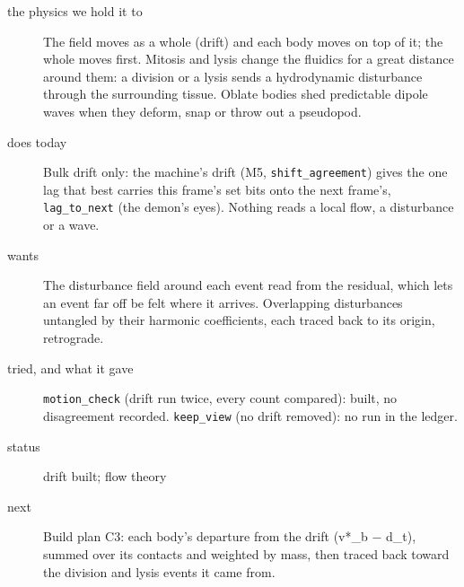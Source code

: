 \begin{description}
\item[{the physics we hold it to}] The field moves as a whole (drift) and each body moves on top of it; the whole moves first. Mitosis and lysis change the fluidics for a great distance around them: a division or a lysis sends a hydrodynamic disturbance through the surrounding tissue. Oblate bodies shed predictable dipole waves when they deform, snap or throw out a pseudopod.
\item[{does today}] Bulk drift only: the machine's drift (M5, \texttt{shift\_\allowbreak{}agreement}) gives the one lag that best carries this frame's set bits onto the next frame's, \texttt{lag\_\allowbreak{}to\_\allowbreak{}next} (the demon's eyes). Nothing reads a local flow, a disturbance or a wave.
\item[{wants}] The disturbance field around each event read from the residual, which lets an event far off be felt where it arrives. Overlapping disturbances untangled by their harmonic coefficients, each traced back to its origin, retrograde.
\item[{tried, and what it gave}] \texttt{motion\_\allowbreak{}check} (drift run twice, every count compared): built, no disagreement recorded. \texttt{keep\_\allowbreak{}view} (no drift removed): no run in the ledger.
\item[{status}] drift built; flow theory
\item[{next}] Build plan C3: each body's departure from the drift (v*\_\allowbreak{}b − d\_\allowbreak{}t), summed over its contacts and weighted by mass, then traced back toward the division and lysis events it came from.
\end{description}

